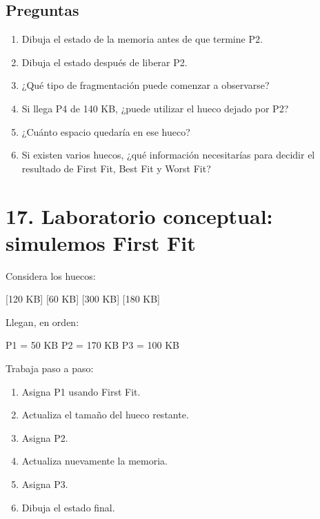 \documentclass[
  spanish,
  letterpaper,
]{scrbook}
\newenvironment{Shaded}{\begin{snugshade}}{\end{snugshade}}
\newcommand{\NormalTok}[1]{\textcolor[rgb]{0.00,0.23,0.31}{#1}}
\providecommand{\tightlist}{%
  \setlength{\itemsep}{0pt}\setlength{\parskip}{0pt}}
\begin{document}
\subsection{Preguntas}\label{preguntas}

\begin{enumerate}
\def\labelenumi{\arabic{enumi}.}
\tightlist
\item
  Dibuja el estado de la memoria antes de que termine P2.
\item
  Dibuja el estado después de liberar P2.
\item
  ¿Qué tipo de fragmentación puede comenzar a observarse?
\item
  Si llega P4 de 140 KB, ¿puede utilizar el hueco dejado por P2?
\item
  ¿Cuánto espacio quedaría en ese hueco?
\item
  Si existen varios huecos, ¿qué información necesitarías para decidir
  el resultado de First Fit, Best Fit y Worst Fit?
\end{enumerate}

\section{17. Laboratorio conceptual: simulemos First
Fit}\label{laboratorio-conceptual-simulemos-first-fit}

Considera los huecos:

\begin{Shaded}
\begin{Highlighting}[]
\NormalTok{[120 KB] [60 KB] [300 KB] [180 KB]}
\end{Highlighting}
\end{Shaded}

Llegan, en orden:

\begin{Shaded}
\begin{Highlighting}[]
\NormalTok{P1 = 50 KB}
\NormalTok{P2 = 170 KB}
\NormalTok{P3 = 100 KB}
\end{Highlighting}
\end{Shaded}

Trabaja paso a paso:

\begin{enumerate}
\def\labelenumi{\arabic{enumi}.}
\tightlist
\item
  Asigna P1 usando First Fit.
\item
  Actualiza el tamaño del hueco restante.
\item
  Asigna P2.
\item
  Actualiza nuevamente la memoria.
\item
  Asigna P3.
\item
  Dibuja el estado final.
\end{enumerate}
\end{document}
